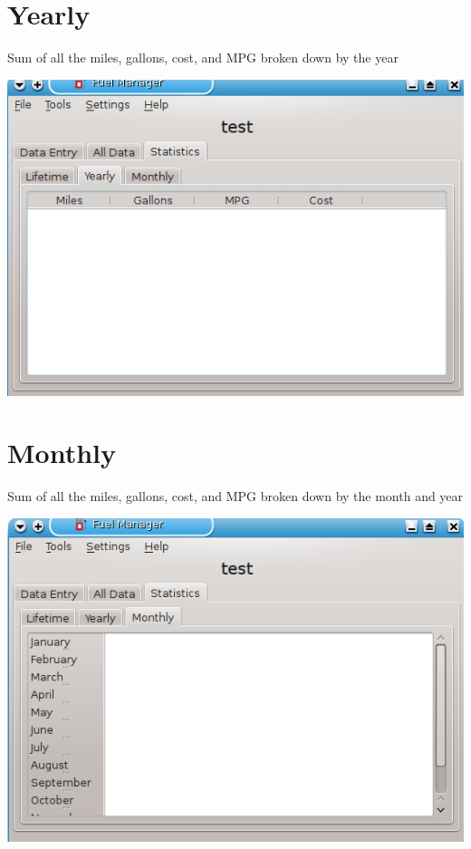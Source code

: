 \section{Yearly}
Sum of all the miles, gallons, cost, and MPG broken down by the year
  \begin{center}
    \includegraphics{snapshot9}
  \end{center}

\section{Monthly}
Sum of all the miles, gallons, cost, and MPG broken down by the month and year
  \begin{center}
    \includegraphics{snapshot10}
  \end{center}
    

